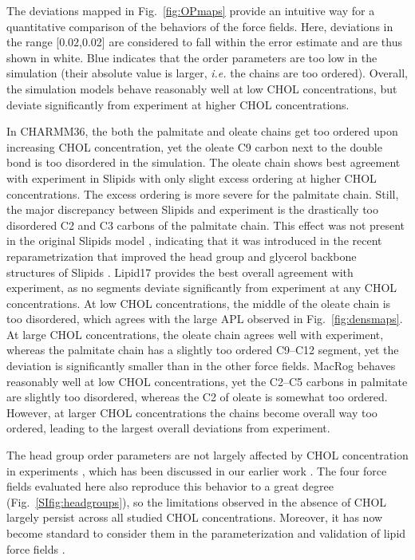 \documentclass[aps,prl,superscriptaddress]{revtex4-2}
\begin{document}
The deviations mapped in Fig.~\ref{fig:OPmaps} provide an intuitive way for a quantitative comparison of the behaviors of the force fields. Here, deviations in the range [$0.02$,0.02] are considered to fall within the error estimate and are thus shown in white. Blue indicates that the order parameters are too low in the simulation (their absolute value is larger, \textit{i.e.} the chains are too ordered). Overall, the simulation models behave reasonably well at low CHOL concentrations, but deviate significantly from experiment at higher CHOL concentrations. 

In CHARMM36, the both the palmitate and oleate chains get too ordered upon increasing CHOL concentration, yet the oleate C9 carbon next to the double bond is too disordered in the simulation. The oleate chain shows best agreement with experiment in Slipids with only slight excess ordering at higher CHOL concentrations. The excess ordering is more severe for the palmitate chain. Still, the major discrepancy between Slipids and experiment is the drastically too disordered C2 and C3 carbons of the palmitate chain. This effect was not present in the original Slipids model \cite{botan15}, indicating that it was introduced in the recent reparametrization that improved the head group and glycerol backbone structures of Slipids \cite{grote2020optimization}. Lipid17 provides the best overall agreement with experiment, as no segments deviate significantly from experiment at any CHOL concentrations. At low CHOL concentrations, the middle of the oleate chain is too disordered, which agrees with the large APL observed in Fig.~\ref{fig:densmaps}. At large CHOL concentrations, the oleate chain agrees well with experiment, whereas the palmitate chain has a slightly too ordered C9--C12 segment, yet the deviation is significantly smaller than in the other force fields. MacRog behaves reasonably well at low CHOL concentrations, yet the C2--C5 carbons in palmitate are slightly too disordered, whereas the C2 of oleate is somewhat too ordered. However, at larger CHOL concentrations the chains become overall way too ordered, leading to the largest overall deviations from experiment.

The head group order parameters are not largely affected by CHOL concentration in experiments \cite{ferreira13}, which has been discussed in our earlier work \cite{botan15}. The four force fields evaluated here also reproduce this behavior to a great degree (Fig.~\ref{SIfig:headgroups}), so the limitations observed in the absence of CHOL\cite{botan15} largely persist across all studied CHOL concentrations. Moreover, it has now become standard to consider them in the parameterization and validation of lipid force fields \cite{dickson2022lipid21,grote2020optimization,yu2021charmm36,yu2021semi}.
\end{document}
